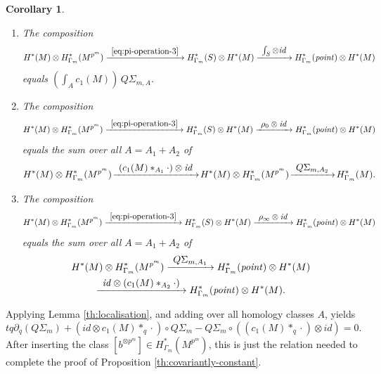 \documentclass[10pt,a4paper]{amsart}
\newcommand{\skpt}{\par\smallskip}
\newcommand\To[1]{\mathchoice{\xrightarrow{\textstyle\kern4pt#1\kern3pt}}{\stackrel{#1}{\longrightarrow}}{}{}}
\theoremstyle{plain}
\newtheorem{corollary}[theorem]{Corollary}
\theoremstyle{definition}
\begin{document}
\skpt
\begin{corollary}
\begin{enumerate}
\item
The composition\vspace*{-5pt}
\begin{equation*}
H^*(M) \otimes H^*_{\Gamma_m}(M^{p^m}) \To{\eqref{eq:pi-operation-3}} H^*_{\Gamma_m}(S) \otimes H^*(M) \To{\int_S \otimes \mathit{id}} H^*_{\Gamma_m}(\mathit{point}) \otimes H^*(M)
\end{equation*}
equals $(\int_A c_1(M)) \, Q\Sigma_{m,A}$.

\smallskip
\item
The composition\vspace*{-5pt}
\begin{equation*}
H^*(M) \otimes H^*_{\Gamma_m}(M^{p^m}) \To{\eqref{eq:pi-operation-3}}
H^*_{\Gamma_m}(S) \otimes H^*(M) \To{\rho_0 \otimes \mathit{id}} H^*_{\Gamma_m}(\mathit{point}) \otimes H^*(M)
\end{equation*}
equals the sum over all $A = A_1+A_2$ of
\begin{equation*}
H^*(M) \otimes H^*_{\Gamma_m}(M^{p^m}) \!\To{(c_1(M) \ast_{A_1} \cdot) \otimes \mathit{id}}\! H^*(M) \otimes H^*_{\Gamma_m}(M^{p^m}) \!\To{Q\Sigma_{m,A_2}}\! H^*_{\Gamma_m}(M).
\end{equation*}

\item
The composition
\begin{equation*}
H^*(M) \otimes H^*_{\Gamma_m}(M^{p^m}) \To{\eqref{eq:pi-operation-3}}
H^*_{\Gamma_m}(S) \otimes H^*(M) \To{\rho_\infty \otimes \mathit{id}} H^*_{\Gamma_m}(\mathit{point}) \otimes H^*(M)
\end{equation*}
equals the sum over all $A = A_1+A_2$ of
\begin{multline*}
H^*(M) \otimes H^*_{\Gamma_m}(M^{p^m}) \To{Q\Sigma_{m,A_1}}
H^*_{\Gamma_m}(\mathit{point}) \otimes H^*(M)
\\
\To{\mathit{id} \otimes (c_1(M) \ast_{A_2} \cdot)} H^*_{\Gamma_m}(\mathit{point}) \otimes H^*(M).
\end{multline*}
\end{enumerate}
\end{corollary}

Applying Lemma \ref{th:localisation}, and adding over all homology classes $A$, yields
\begin{equation*}
tq\partial_q(Q\Sigma_m) + (\mathit{id} \otimes c_1(M) \ast_q \cdot) \circ Q\Sigma_m - Q\Sigma_m \circ
((c_1(M) \ast_q \cdot) \otimes \mathit{id}) = 0.
\end{equation*}
After inserting the class $[b^{\otimes p^m}] \in H^*_{\Gamma_m}(M^{p^m})$, this is just the relation needed to complete the proof of Proposition \ref{th:covariantly-constant}.
\end{document}
